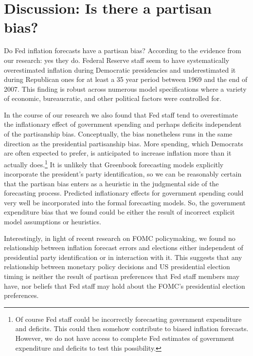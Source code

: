 \documentclass[a4paper]{article}\usepackage{graphicx, color}
\begin{document}
\section*{Discussion: Is there a partisan bias?}

Do Fed inflation forecasts have a partisan bias? According to the evidence from our research: yes they do. Federal Reserve staff seem to have systematically overestimated inflation during Democratic presidencies and underestimated it during Republican ones for at least a 35 year period between 1969 and the end of 2007. This finding is robust across numerous model specifications where a variety of economic, bureaucratic, and other political factors were controlled for. 

In the course of our research we also found that Fed staff tend to overestimate the inflationary effect of government spending and perhaps deficits independent of the partisanship bias. Conceptually, the bias nonetheless runs in the same direction as the presidential partisanship bias. More spending, which Democrats are often expected to prefer, is anticipated to increase inflation more than it actually does.\footnote{Of course Fed staff could be incorrectly forecasting government expenditure and deficits. This could then somehow contribute to biased inflation forecasts. However, we do not have access to complete Fed estimates of government expenditure and deficits to test this possibility.} It is unlikely that Greenbook forecasting models explicitly incorporate the president's party identification, so we can be reasonably certain that the partisan bias enters as a heuristic in the judgmental side of the forecasting process. Predicted inflationary effects for government spending could very well be incorporated into the formal forecasting models. So, the government expenditure bias that we found could be either the result of incorrect explicit model assumptions or heuristics.

Interestingly, in light of recent research on FOMC policymaking, we found no relationship between inflation forecast errors and elections either independent of presidential party identification or in interaction with it. This suggests that any relationship between monetary policy decisions and US presidential election timing is neither the result of partisan preferences that Fed staff members may have, nor beliefs that Fed staff may hold about the FOMC's presidential election preferences. 
\end{document}
